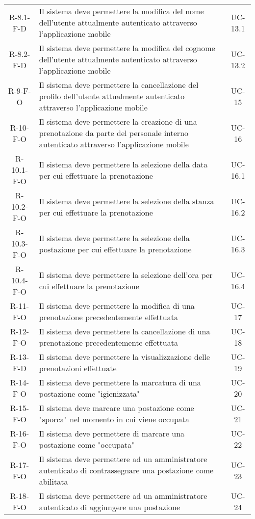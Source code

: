 \begin{longtable}{ c C{9cm} c }
    R-8.1-F-D & Il sistema deve permettere la modifica del nome dell'utente attualmente autenticato attraverso l'applicazione mobile & UC-13.1 \\
    R-8.2-F-D & Il sistema deve permettere la modifica del cognome dell'utente attualmente autenticato attraverso l'applicazione mobile & UC-13.2 \\
    R-9-F-O & Il sistema deve permettere la cancellazione del profilo dell'utente attualmente autenticato attraverso l'applicazione mobile & UC-15 \\
    R-10-F-O & Il sistema deve permettere la creazione di una prenotazione da parte del personale interno autenticato attraverso l'applicazione mobile & UC-16 \\
    R-10.1-F-O & Il sistema deve permettere la selezione della data per cui effettuare la prenotazione & UC-16.1 \\
    R-10.2-F-O & Il sistema deve permettere la selezione della stanza per cui effettuare la prenotazione & UC-16.2 \\
    R-10.3-F-O & Il sistema deve permettere la selezione della postazione per cui effettuare la prenotazione & UC-16.3 \\
    R-10.4-F-O & Il sistema deve permettere la selezione dell'ora per cui effettuare la prenotazione & UC-16.4 \\
    R-11-F-O & Il sistema deve permettere la modifica di una prenotazione precedentemente effettuata & UC-17 \\
    R-12-F-O & Il sistema deve permettere la cancellazione di una prenotazione precedentemente effettuata & UC-18 \\
    R-13-F-D & Il sistema deve permettere la visualizzazione delle prenotazioni effettuate & UC-19 \\
    R-14-F-O & Il sistema deve permettere la marcatura di una postazione come "igienizzata" & UC-20 \\
    R-15-F-O & Il sistema deve marcare una postazione come "sporca" nel momento in cui viene occupata & UC-21 \\
    R-16-F-O & Il sistema deve permettere di marcare una postazione come "occupata" & UC-22 \\
    R-17-F-O & Il sistema deve permettere ad un amministratore autenticato di contrassegnare una postazione come abilitata & UC-23 \\
    R-18-F-O & Il sistema deve permettere ad un amministratore autenticato di aggiungere una postazione & UC-24 \\

\end{longtable}
